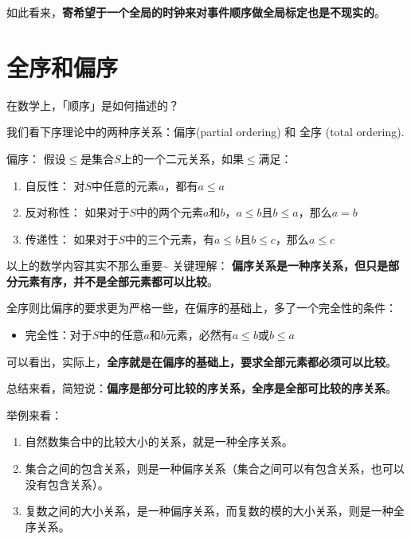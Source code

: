 \documentclass[cn,11pt,chinese]{elegantbook}
\providecommand{\tightlist}{%
  \setlength{\itemsep}{0pt}\setlength{\parskip}{0pt}}
\begin{document}
如此看来，\textbf{寄希望于一个全局的时钟来对事件顺序做全局标定也是不现实的}。

\hypertarget{ux5168ux5e8fux548cux504fux5e8f}{%
\section{全序和偏序}\label{ux5168ux5e8fux548cux504fux5e8f}}

在数学上，「顺序」是如何描述的？

我们看下序理论中的两种序关系：偏序(partial ordering) 和 全序 (total
ordering).

偏序： 假设\(\leq\)是集合\(S\)上的一个二元关系，如果\(\leq\)满足：

\begin{enumerate}
\def\labelenumi{\arabic{enumi}.}
\tightlist
\item
  自反性： 对\(S\)中任意的元素\(a\)，都有\(a \leq a\)
\item
  反对称性：
  如果对于\(S\)中的两个元素\(a\)和\(b\)，\(a \leq b\)且\(b \leq a\)，那么\(a = b\)
\item
  传递性：
  如果对于\(S\)中的三个元素，有\(a \leq b\)且\(b \leq c\)，那么\(a \leq c\)
\end{enumerate}

以上的数学内容其实不那么重要\textasciitilde{} 关键理解：
\textbf{偏序关系是一种序关系，但只是部分元素有序，并不是全部元素都可以比较}。

全序则比偏序的要求更为严格一些，在偏序的基础上，多了一个完全性的条件：

\begin{itemize}
\tightlist
\item
  完全性：对于\(S\)中的任意\(a\)和\(b\)元素，必然有\(a \leq b\)或\(b \leq a\)
\end{itemize}

可以看出，实际上，\textbf{全序就是在偏序的基础上，要求全部元素都必须可以比较}。

总结来看，简短说：\textbf{偏序是部分可比较的序关系，全序是全部可比较的序关系}。

举例来看：

\begin{enumerate}
\def\labelenumi{\arabic{enumi}.}
\tightlist
\item
  自然数集合中的比较大小的关系，就是一种全序关系。
\item
  集合之间的包含关系，则是一种偏序关系（集合之间可以有包含关系，也可以没有包含关系）。
\item
  复数之间的大小关系，是一种偏序关系，而复数的模的大小关系，则是一种全序关系。
\end{enumerate}
\end{document}
